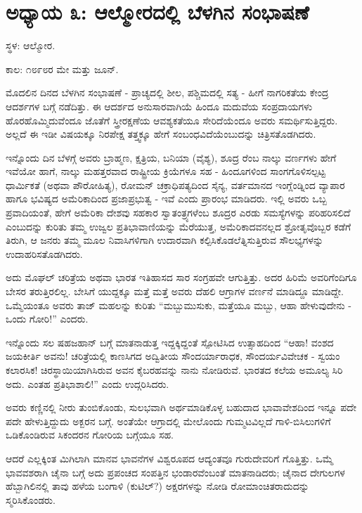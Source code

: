 
\chapter{ಅಧ್ಯಾಯ ೩: ಆಲ್ಮೋರದಲ್ಲಿ ಬೆಳಗಿನ ಸಂಭಾಷಣೆ}

ಸ್ಥಳ: ಆಲ್ಮೋರ.

ಕಾಲ: ೧೮೯೮ರ ಮೇ ಮತ್ತು ಜೂನ್.

ಮೊದಲಿನ ದಿನದ ಬೆಳಗಿನ ಸಂಭಾಷಣೆ - ಪ್ರಾಚ್ಯದಲ್ಲಿ ಶೀಲ, ಪಶ್ಚಿಮದಲ್ಲಿ ಸತ್ಯ - ಹೀಗೆ ನಾಗರಿಕತೆಯ ಕೇಂದ್ರ ಆದರ್ಶಗಳ ಬಗ್ಗೆ ನಡೆದಿತ್ತು. ಈ ಆದರ್ಶದ ಅನುಸಾರವಾಗಿಯೆ ಹಿಂದೂ ಮದುವೆಯ ಸಂಪ್ರದಾಯಗಳು ಹೊರಹೊಮ್ಮಿದುವೆಂದೂ ಜೊತೆಗೆ ಸ್ತ್ರೀರಕ್ಷಣೆಯ ಆವಶ್ಯಕತೆಯೂ ಸೇರಿದೆಯೆಂದೂ ಅವರು ಸಮರ್ಥಿಸುತ್ತಿದ್ದರು. ಅಲ್ಲದೆ ಈ ಇಡೀ ವಿಷಯಕ್ಕೂ ನಿರಪೇಕ್ಷ ತತ್ತ್ವಕ್ಕೂ ಹೇಗೆ ಸಂಬಂಧವಿದೆಯೆಂಬುದನ್ನು ಚಿತ್ರಿಸತೊಡಗಿದರು.

ಇನ್ನೊಂದು ದಿನ ಬೆಳಗ್ಗೆ ಅವರು ಬ್ರಾಹ್ಮಣ, ಕ್ಷತ್ರಿಯ, ಬನಿಯಾ (ವೈಶ್ಯ), ಶೂದ್ರ ರೆಂಬ ನಾಲ್ಕು ವರ್ಣಗಳು ಹೇಗೆ ಇವೆಯೋ ಹಾಗೆ, ನಾಲ್ಕು ಮಹತ್ತರವಾದ ರಾಷ್ಟ್ರೀಯ ಕ್ರಿಯೆಗಳೂ ಸಹ - ಹಿಂದೂಗಳಿಂದ ಸಾಂಗಗೊಳಿಸಲ್ಪಟ್ಟ ಧಾರ್ಮಿಕತೆ (ಅಥವಾ ಪೌರೋಹಿತ್ಯ), ರೋಮನ್ ಚಕ್ರಾಧಿಪತ್ಯದಿಂದ ಸೈನ್ಯ, ವರ್ತಮಾನದ ಇಂಗ್ಲೆಂಡ್ನಿಂದ ವ್ಯಾಪಾರ ಹಾಗೂ ಭವಿಷ್ಯದ ಅಮೆರಿಕಾದಿಂದ ಪ್ರಜಾಪ್ರಭುತ್ವ - ಇವೆ ಎಂದು ಪ್ರಾರಂಭ ಮಾಡಿದರು. ಇಲ್ಲಿ ಅವರು ಒಬ್ಬ ಪ್ರವಾದಿಯಂತೆ, ಹೇಗೆ ಅಮೆರಿಕಾ ದೇಶವು ಸಹಕಾರ ಸ್ವಾತಂತ್ರ್ಯಗಳೆಂಬ ಶೂದ್ರರ ಎರಡು ಸಮಸ್ಯೆಗಳನ್ನು ಪರಿಹರಿಸಲಿದೆ ಎಂಬುದನ್ನು ಕುರಿತು ತಮ್ಮ ಉಜ್ವಲ ಪ್ರತಿಭಾವಾಣಿಯನ್ನು ಮೆರೆಯುತ್ತ, ಅಮೆರಿಕಾದವನಲ್ಲದ ಶ್ರೋತೃವೊಬ್ಬರ ಕಡೆಗೆ ತಿರುಗಿ, ಆ ಜನರು ತಮ್ಮ ಮೂಲ ನಿವಾಸಿಗಳಿಗಾಗಿ ಉದಾರವಾಗಿ ಕಲ್ಪಿಸಿಕೊಡಲೆತ್ನಿಸುತ್ತಿರುವ ಸೌಲಭ್ಯಗಳನ್ನು ಉದಾಹರಿಸತೊಡಗಿದರು.

ಅದು ಮೊಘಲ್ ಚರಿತ್ರೆಯ ಅಥವಾ ಭಾರತ ಇತಿಹಾಸದ ಸಾರ ಸಂಗ್ರಹವೇ ಆಗುತ್ತಿತ್ತು. ಅದರ ಹಿರಿಮೆ ಅವರಿಗೆಂದಿಗೂ ಬೇಸರ ತರುತ್ತಿರಲಿಲ್ಲ. ಬೇಸಿಗೆ ಯುದ್ದಕ್ಕೂ ಮತ್ತೆ ಮತ್ತೆ ಅವರು ದೆಹಲಿ ಆಗ್ರಾಗಳ ವರ್ಣನೆ ಮಾಡಿದ್ದೂ ಮಾಡಿದ್ದೇ. ಒಮ್ಮೆಯಂತೂ ಅವರು ತಾಜ್ ಮಹಲನ್ನು ಕುರಿತು “ಮಬ್ಬುಮುಸುಕು, ಮತ್ತೆಯೂ ಮಬ್ಬು, ಆಹಾ ಹೇಳುವುದೇನು - ಒಂದು ಗೋರಿ!” ಎಂದರು.

ಇನ್ನೊಂದು ಸಲ ಷಹಜಹಾನ್ ಬಗ್ಗೆ ಮಾತನಾಡುತ್ತ ಇದ್ದಕ್ಕಿದ್ದಂತೆ ಸ್ಪೋಟಿಸಿದ ಉತ್ಸಾಹದಿಂದ “ಆಹಾ! ವಂಶದ ಜಯಕೀರ್ತಿ ಅವನು! ಚರಿತ್ರೆಯಲ್ಲಿ ಕಾಣಸಿಗದ ಅದ್ವಿತೀಯ ಸೌಂದರ್ಯಾರಾಧಕ, ಸೌಂದರ್ಯವಿವೇಚಕ - ಸ್ವಯಂ ಕಲಾರಸಿಕ! ಚಿರಸ್ಥಾಯಿಯಾಗಿಸಿರುವ ಅವನ ಕೈಬರಹವನ್ನು ನಾನು ನೋಡಿರುವೆ. ಭಾರತದ ಕಲೆಯ ಅಮೂಲ್ಯ ಸಿರಿ ಅದು. ಎಂತಹ ಪ್ರತಿಭಾಶಾಲಿ!” ಎಂದು ಉದ್ಗರಿಸಿದರು.

ಅವರು ಕಣ್ಣಿನಲ್ಲಿ ನೀರು ತುಂಬಿಕೊಂಡು, ಸುಲಭವಾಗಿ ಅರ್ಥಮಾಡಿಕೊಳ್ಳ ಬಹುದಾದ ಭಾವಾವೇಶದಿಂದ ಇನ್ನೂ ಪದೇ ಪದೇ ಹೇಳುತ್ತಿದ್ದುದು ಅಕ್ಬರನ ಬಗ್ಗೆ. ಅಂತೆಯೇ ಆಗ್ರಾದಲ್ಲಿ ಮೇಲೊಂದು ಗುಮ್ಮಟವಿಲ್ಲದೆ ಗಾಳಿ-ಬಿಸಿಲುಗಳಿಗೆ ಒಡಿಕೊಂಡಿರುವ ಸಿಕಂದರನ ಗೋರಿಯ ಬಗ್ಗೆಯೂ ಸಹ.

ಆದರೆ ಎಲ್ಲಕ್ಕಿಂತ ಮಿಗಿಲಾಗಿ ಮಾನವ ಭಾವನೆಗಳ ವಿಶ್ವರೂಪದ ಆದ್ಯಂತವೂ ಗುರುದೇವರಿಗೆ ಗೊತ್ತಿತ್ತು. ಒಮ್ಮೆ ಭಾವವಶರಾಗಿ ಚೈನಾ ಬಗ್ಗೆ ಅದು ಪ್ರಪಂಚದ ಸಂಪತ್ತಿನ ಭಂಡಾರವೆಂಬಂತೆ ಮಾತನಾಡಿದರು; ಚೈನಾದ ದೇಗುಲಗಳ ಹೆಬ್ಬಾಗಿಲಿನಲ್ಲಿ ತಾವು ಹಳೆಯ ಬಂಗಾಳಿ (ಕುಟಿಲ್?) ಅಕ್ಷರಗಳನ್ನು ನೋಡಿ ರೋಮಾಂಚಿತರಾದುದನ್ನು ಸ್ಮರಿಸಿಕೊಂಡರು.

